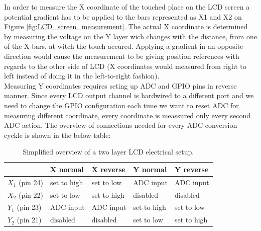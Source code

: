 In order to measure the X coordinate of the touched place on the LCD screen a potential gradient has to be applied to the bars represented as X1 and X2 on Figure \ref{fig:LCD_screen_measurement}. The actual X coordinate is determined by measuring the voltage on the Y layer wich changes with the distance, from one of the X bars, at witch the touch accured. Applying a gradient in an opposite direction would cause the measurement to be giving position references with regards to the other side of LCD (X coordinates would measured from right to left instead of doing it in the left-to-right fashion). \\
Measuring Y coordinates requires seting up ADC and GPIO pins in reverse manner. Since every LCD output channel is hardwired to a different port and we need to change the GPIO configuration each time we want to reset ADC for measuring different coordinate, every coordinate is meassured only every second ADC action. The overview of connections needed for every ADC conversion cyckle is shown in the below table:

\begin{table}[!h]\caption{Simplified overview of a two layer LCD electrical setup.}\begin{tabular}{|l|l|l|l|l|}\hline & X normal & X reverse & Y normal & Y reverse \\ \hline $X_{1}$ (pin 24) & set to high & set to low & ADC input & ADC input \\ \hline $X_{2}$ (pin 22) & set to low & set to high & disabled & disabled\\ \hline $Y_{1}$ (pin 23) & ADC input & ADC input & set to high & set to low \\ \hline $Y_{2}$ (pin 21) & disabled & disabled & set to low & set to high \\ \hline\end{tabular}\label{table:LCD_screen_measurement} \end{table} 



